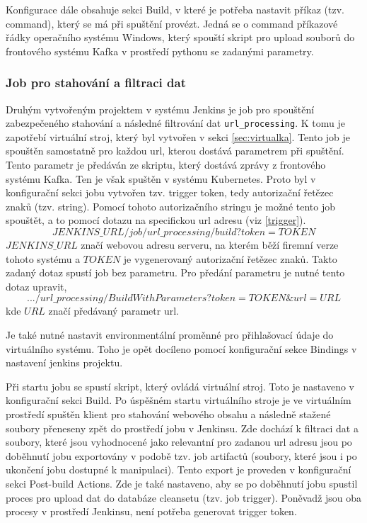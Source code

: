 \documentclass[thesis=M,czech,hidelinks]{FITthesis}[2013/05/06]
\begin{document}
Konfigurace dále obsahuje sekci Build, v které je potřeba nastavit příkaz (tzv. command), který se má při spuštění provézt. Jedná se o command příkazové řádky operačního systému Windows, který spouští skript pro upload souborů do frontového systému Kafka v prostředí pythonu se zadanými parametry.



\subsubsection{Job pro stahování a filtraci dat} \label{sec:jenkinsvirt}
Druhým vytvořeným projektem v systému Jenkins je job pro spouštění zabezpečeného stahování a následné filtrování dat \texttt{url_processing}. K tomu je zapotřebí virtuální stroj, který byl vytvořen v sekci \ref{sec:virtualka}. Tento job je spouštěn samostatně pro každou url, kterou dostává parametrem při spuštění. Tento parametr je předáván ze skriptu, který dostává zprávy z frontového systému Kafka. Ten je však spuštěn v systému Kubernetes. Proto byl v konfigurační sekci jobu vytvořen tzv. trigger token, tedy autorizační řetězec znaků (tzv. string). Pomocí tohoto autorizačního stringu je možné tento job spouštět, a to pomocí dotazu na specifickou url adresu (viz \ref{trigger}).
\begin{equation} \label{trigger}
JENKINS\_URL/job/url\_processing/build?token=TOKEN
\end{equation}
$JENKINS\_URL$ značí webovou adresu serveru, na kterém běží firemní verze tohoto systému a $TOKEN$ je vygenerovaný autorizační řetězec znaků. Takto zadaný dotaz spustí job bez parametru. Pro předání parametru je nutné tento dotaz upravit,
\begin{equation}
.../url\_processing/BuildWithParameters?token=TOKEN\&url=URL
\end{equation}
kde $URL$ značí předávaný parametr url.

Je také nutné nastavit environmentální proměnné pro přihlašovací údaje do virtuálního systému. Toho je opět docíleno pomocí konfigurační sekce Bindings v nastavení jenkins projektu. 

Při startu jobu se spustí skript, který ovládá virtuální stroj. Toto je nastaveno v konfigurační sekci Build. Po úspěšném startu virtuálního stroje je ve virtuálním prostředí spuštěn klient pro stahování webového obsahu a následně stažené soubory přeneseny zpět do prostředí jobu v Jenkinsu. Zde dochází k filtraci dat a soubory, které jsou vyhodnocené jako relevantní pro zadanou url adresu jsou po doběhnutí jobu exportovány v podobě tzv. job artifactů (soubory, které jsou i po ukončení jobu dostupné k manipulaci). Tento export je proveden v konfigurační sekci Post-build Actions. Zde je také nastaveno, aby se po doběhnutí jobu spustil proces pro upload dat do databáze cleansetu (tzv. job trigger). Poněvadž jsou oba procesy v prostředí Jenkinsu, není potřeba generovat trigger token.
\end{document}
